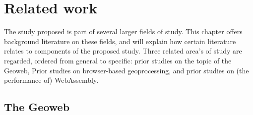 
\newpage

\section{Related work}


The study proposed is part of several larger fields of study. This chapter offers background literature on these fields, and will explain how certain literature relates to components of the proposed study. 
Three related area's of study are regarded, ordered from general to specific: prior studies on the topic of the Geoweb, Prior studies on browser-based geoprocessing, and prior studies on (the performance of) WebAssembly.

\subsection{The Geoweb}

%



